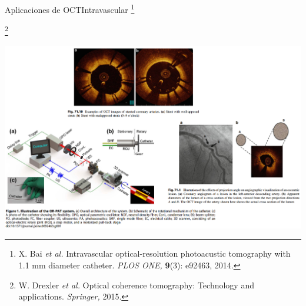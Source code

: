 \documentclass[fleqn,10pt]{beamer}
\newcommand\blfootnote[1]{%
	\begingroup
	\renewcommand\thefootnote{}\footnote{#1}%
	\addtocounter{footnote}{-1}%
	\endgroup
}
\begin{document}
%	

\begin{frame}{Aplicaciones de OCT}{Intravascular}
	\blfootnote{\tiny{X. Bai \emph{et al.} Intravascular optical-resolution photoacustic tomography with 1.1 mm diameter catheter. \emph{PLOS ONE,} \textbf{9}(3): e92463, 2014.}}\blfootnote{\tiny{W. Drexler \emph{et al.} Optical coherence tomography: Technology and applications. \emph{Springer,} 2015.}}
		
	\begin{center}
		\includegraphics[width=1\linewidth]{AAUgraphics/pt1/oct_iv}
	\end{center}
	
\end{frame}
\end{document}
